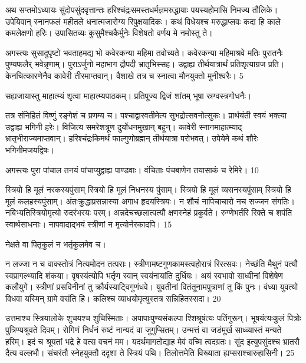 अथ सप्तमोऽध्यायः
सुंदोपसुंदवृत्तान्तः हरिश्चंद्रःसमस्तधर्मज्ञमरुद्धायाः
पयस्यहोमासि निमज्य तौलिके।
उपेयिवान् स्नानफलं महीतले
धनात्मजारोग्य रिपुक्षयादिकः।
कथं विधेयश्च मरुद्धाप्लवः कदा हि
काले कमलेक्षणो हरिः।
उपासितव्यः कुसुमैश्चकैर्मुनेः विशेषतो
वर्णय मे नमोस्तु ते।

अगस्त्यः
सुसादुपृष्टो भवताहमद्य भो कवेरकन्या महिमा तवोच्यते।
कवेरकन्या महिमाश्रवे मतिः पुरातनैः
पुण्यफलैर् भवेन्नृणाम्।
पुराऽर्जुनो महाभाग द्रौपदी भ्रातृभिस्सह।
उद्वाह्य तीर्थयात्रार्थं प्रतिशृत्याग्रज प्रति।
केनचित्कारणेनैव कावेरी तीरमाप्तवान्।
वैशाखे तत्र च स्नात्वा मौनयुक्तो मुनीश्वरैः।
5

सह्यजायास्तु माहात्म्यं शृत्वा माहात्म्यपाठकम्।
प्रतिपूज्य द्विजं शांतम् भूषा स्रग्वस्त्रगोधनैः।

तत्र संनिहितं विष्णुं रङ्गेशं च प्रणम्य च।
पश्चाद्वारवतीमेत्य सुभद्रोत्सवनोत्सुकः।
प्रार्थयंती स्वयं भक्त्या उद्वाह्य भगिनी हरेः।
विजित्य समरेशत्रूण दुर्योधनमुखान् बहून्।
कावेरी स्नानमाहात्म्याद् भ्रातृभीराज्यमाप्तवान्।
हरिश्चंद्रःकिमर्थं फाल्गुणोब्रह्मन् तीर्थयात्रा परोभवत्।
उपेयेमे कथं शौरेः भगिनीमजयद्विषः।

अगस्त्यः
पुरा पांचाल तनयं पांचाप्युद्वाह्य पाण्डवाः।
वंचिताः पंचबाणेन तयासाकं च रेमिरे।
10

स्त्रियो हि मूलं नरकस्यपुंसाम् स्त्रियो
हि मूलं निधनस्य पुंसाम्।
स्त्रियो हि मूलं व्यसनस्यपुंसाम् स्त्रियो
हि मूलं कलहस्यपुंसाम्।
अंतःक्रुद्धाप्रसन्नास्या अगाध हृदयस्त्रियः।
न शौचं नापिचाचारो नच सज्जन संगतिः।
नबिभ्यतिस्त्रियोमृत्यो रुदरंभरयः परम्।
अन्नदेचच्छलात्पत्यौ क्षणस्नेहं प्रकुर्वते।
रुग्णेभर्तरि रिक्ते च शपंति स्वार्थसाधनाः।
नापवादाद्भयं स्त्रीणां न मृत्योर्नरकादपि।
15

नेक्षते वा पितृकुलं न भर्तृकुलमेव च।

न लज्जा न च वाक्स्तोत्रं नित्यमोदन तत्पराः।
स्त्रीणामष्टगुणकामस्त्वहोरात्रं रिरत्सवः।
नेच्छंति मैथुनं पत्यौ स्वप्रागल्भ्यादि शंकया।
वृषस्यंत्योपि भर्तृण स्वान् स्वयंनायांति दुर्धियः।
अयं स्वभावो साध्वीनां विशेषेण कलौयुगे।
स्त्रीणां प्रसविनीनां तु क्रौर्यस्याट्विगुणंधवे।
युवतीनां वितंतूनामपुत्राणां तु किं पुनः।
वंध्या युवत्यो विधवा यस्मिन् ग्रामे वसंति हि।
कलिश्च व्याधयोमृत्युस्तत्र सन्निहितस्सदा।
20

उत्तमाश्च स्त्रियालोके शुचयश्च शुचिस्मिताः।
अपापाःपुण्यसंकल्पा श्शिश्रूषंत्यः पतिंगुरून्।
भूषयंत्यःकुलं पित्रोः पुत्रिण्यश्रुवते दिवम्।
रोगिणं निर्धनं रुष्टं नान्यदं वा जुगुप्सितम्।
उन्मत्तं वा जडंमूर्ख साध्व्यास्तं मन्यते हरिम्।
इदं च श्रूयतां भद्रे हे वत्स वचनं मम।
यदर्थमागतोद्याह मेवं वच्मि त्वदग्रतः।
सुंद इत्युपसुंदश्च भ्रातरौ दैत्य वल्लभौ।
संचरंतौ स्नेहयुक्तौ ददृशा ते स्त्रियं पथि।
तिलोत्तमेति विख्याता ह्यप्सराश्चारुहासिनी।
25

